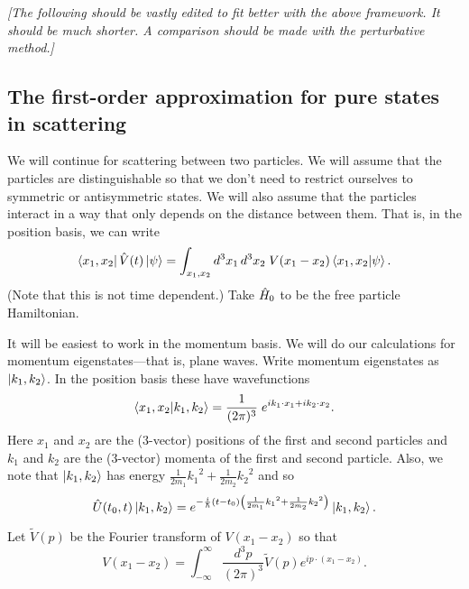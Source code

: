 \emph{[The following should be vastly edited to fit better with the above framework. It should be much shorter. A comparison should be made with the perturbative method.]}


\subsection{The first-order approximation for pure states in scattering}

We will continue for scattering between two particles. We will assume that the particles are distinguishable so that we don't need to restrict ourselves to symmetric or antisymmetric states. We will also assume that the particles interact in a way that only depends on the distance between them. That is, in the position basis, we can write
\begin{equation}\label{eq.Vposbasis}
\left\langle x_1, x_2\right|\hat{V}(t)\left|\psi\right\rangle = \int_{x_1,x_2} {d^3 x_1 \,d^3x_2}\; V(x_1 - x_2) \left\langle x_1, x_2|\psi\right\rangle.
\end{equation}
(Note that this is not time dependent.) Take \(\hat{H}_0\) to be the free particle Hamiltonian.

It will be easiest to work in the momentum basis. We will do our calculations for momentum eigenstates---that is, plane waves. Write momentum eigenstates as \(\left|k_1, k_2\right\rangle\). In the position basis these have wavefunctions
\begin{equation}\label{eq.momentuminpos}
\left\langle x_1, x_2|k_1, k_2\right\rangle = \frac{1}{(2\pi)^3}\;e^{ik_1\cdot x_1 + ik_2\cdot x_2}.
\end{equation}
Here \(x_1\) and \(x_2\) are the (3-vector) positions of the first and second particles and \(k_1\) and \(k_2\) are the (3-vector) momenta of the first and second particle. Also, we note that \(\left|k_1, k_2\right\rangle\) has energy \(\frac{1}{2m_1}{k_1}^2 + \frac{1}{2m_2}{k_2}^2\) and so
\begin{equation}
\label{eq.timeevonk}
\hat{U}(t_0, t) \left|k_1, k_2\right\rangle = e^{-\frac{i}{\hbar}\left(t-t_0\right)\left(\frac{1}{2m_1}{k_1}^2 + \frac{1}{2m_2}{k_2}^2\right)} \left|k_1, k_2\right\rangle.
\end{equation}

Let \(\widetilde{V}(p)\) be the Fourier transform of \(V(x_1 - x_2)\) so that
\begin{equation}
\label{eq.ftV}
V(x_1 - x_2) = \int_{-\infty}^{\infty} \frac{d^3 p}{(2 \pi)^3} \widetilde{V}(p) e^{ip\cdot(x_1 - x_2)}.
\end{equation}

